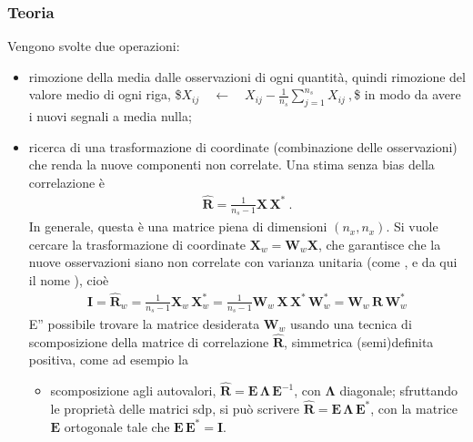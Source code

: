 \documentclass[letterpaper,10pt,italian]{jupyterBook}
\begin{document}
\subsubsection*{Teoria}

\sphinxAtStartPar
Vengono svolte due operazioni:
\begin{itemize}
\item {} 
\sphinxAtStartPar
rimozione della media dalle osservazioni di ogni quantità, quindi rimozione del valore medio di ogni riga,
\$\(X_{ij} \quad \leftarrow \quad X_{ij} - \frac{1}{n_s} \sum_{j = 1}^{n_s} X_{ij} \ ,\)\$
in modo da avere i nuovi segnali a media nulla;

\item {} 
\sphinxAtStartPar
ricerca di una trasformazione di coordinate (combinazione delle osservazioni) che renda la nuove componenti non correlate. Una stima senza bias della correlazione è
\begin{equation*}
\begin{split}\hat{\mathbf{R}} = \frac{1}{n_s - 1} \mathbf{X} \, \mathbf{X}^* \ .\end{split}
\end{equation*}
\sphinxAtStartPar
In generale, questa è una matrice piena di dimensioni \((n_x, n_x)\). Si vuole cercare la trasformazione di coordinate \(\mathbf{X}_w = \mathbf{W}_w \mathbf{X}\), che garantisce che la nuove osservazioni siano non correlate con varianza unitaria (come , e da qui il nome ), cioè
\begin{equation*}
\begin{split}\mathbf{I} = \hat{\mathbf{R}}_w = \frac{1}{n_s - 1} \mathbf{X}_w \, \mathbf{X}_w^* = \frac{1}{n_s - 1} \mathbf{W}_w \, \mathbf{X} \, \mathbf{X}^*  \, \mathbf{W}_w^* = \mathbf{W}_w \, \hat{\mathbf{R}} \, \mathbf{W}_w^*\end{split}
\end{equation*}
\sphinxAtStartPar
E” possibile trovare la matrice desiderata \(\mathbf{W}_w\) usando una tecnica di scomposizione della matrice di correlazione \(\hat{\mathbf{R}}\), simmetrica (semi)definita positiva, come ad esempio la
\begin{itemize}
\item {} 
\sphinxAtStartPar
scomposizione agli autovalori, \(\hat{\mathbf{R}} = \mathbf{E} \, \symbf{\Lambda} \, \mathbf{E}^{-1}\), con \(\symbf{\Lambda}\) diagonale; sfruttando le proprietà delle matrici sdp, si può scrivere  \(\hat{\mathbf{R}} = \mathbf{E} \, \symbf{\Lambda} \, \mathbf{E}^*\), con la matrice \(\mathbf{E}\) ortogonale tale che \(\mathbf{E} \, \mathbf{E}^* = \mathbf{I}\).


\end{itemize}
\end{itemize}
\end{document}
